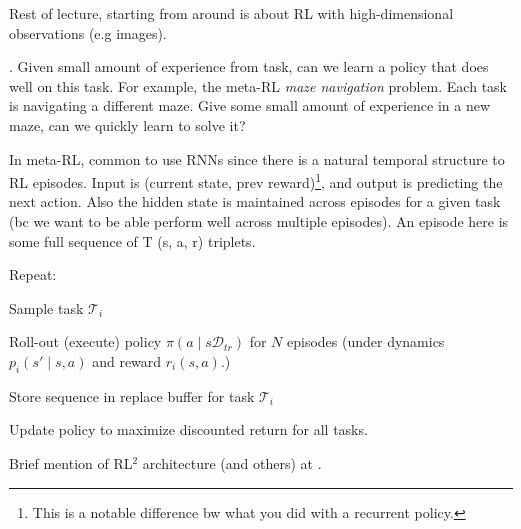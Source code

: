 \documentclass[11pt]{article}
\newcommand\task{\mathscr{T}}
\begin{document}
 
Rest of lecture, starting from around  is about RL with high-dimensional observations (e.g images). 
 
 
 
 
 
 
 
 
 
 
 
 . Given small amount of experience from task, can we learn a policy that does well on this task. For example, the meta-RL \textit{maze navigation} problem. Each task is navigating a different maze. Give some small amount of experience in a new maze, can we quickly learn to solve it? 
 
 
In meta-RL, common to use RNNs since there is a natural temporal structure to RL episodes. Input is (current state, prev reward)\footnote{This is a notable difference bw what you did with a recurrent policy.}, and output is predicting the next action. Also the hidden state is maintained across episodes for a given task (bc we want to be able perform well across multiple episodes). An episode here is some full sequence of T (s, a, r) triplets.
 
\begin{algorithm}
	Repeat:
	\begin{compactenum}
		\item Sample task $\task_i$ 
		\item Roll-out (execute) policy $\pi(a \mid s \mathcal{D}_{tr})$ for $N$ episodes (under dynamics $p_i(s' \mid s, a)$ and reward $r_i(s, a)$.)
		\item Store sequence in replace buffer for task $\task_i$ 
		\item Update policy to maximize discounted return for all tasks. 
	\end{compactenum}
\end{algorithm}

Brief mention of RL$^2$ architecture (and others) at . 
 
 
 
 
 
 
 
\end{document}
